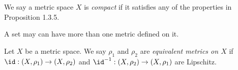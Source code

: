     \begin{definition}
        We say a metric space $X$ is \textit{compact} if it satisfies any of the properties in Proposition 1.3.5.
    \end{definition}

    A set may can have more than one metric defined on it. 

    \begin{definition}
        Let $X$ be a metric space. We say $\rho_1$ and $\rho_2$ are \textit{equivalent metrics on $X$} if $\id:(X,\rho_1) \rightarrow (X,\rho_2)$ and $\id^{-1}:(X,\rho_2) \rightarrow (X,\rho_1)$ are Lipschitz.
    \end{definition}

    


